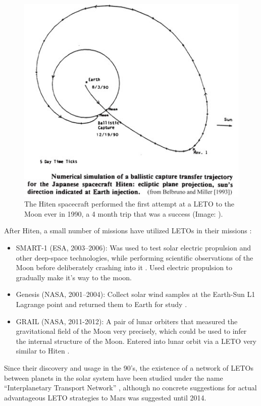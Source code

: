 \begin{figure}[ht]
    \centering
    \includegraphics[width=0.60\linewidth]{fig/hiten.png}
    \caption{The Hiten spacecraft performed the first attempt at a LETO to the Moon ever in 1990, a 4 month trip that was a success (Image: \cite{Belbuno1990}).}
    \label{fig:hiten}
\end{figure}

After Hiten, a small number of missions have utilized LETOs in their missions \cite{Wikipedia}:
\begin{itemize}
	\item SMART-1 (ESA, 2003--2006): Was used to test solar electric propulsion and other deep-space technologies, while performing scientific observations of the Moon before deliberately crashing into it \cite{ESA}. Used electric propulsion to gradually make it's way to the moon.
    \item Genesis (NASA, 2001--2004): Collect solar wind samples at the Earth-Sun L1 Lagrange point and returned them to Earth for study \cite{NASAa}.
    \item GRAIL (NASA, 2011-2012): A pair of lunar orbiters that measured the gravitational field of the Moon very precisely, which could be used to infer the internal structure of the Moon. Entered into lunar orbit via a LETO very similar to Hiten \cite{NASA2013,Wikipediaa}. 
\end{itemize}

Since their discovery and usage in the 90's, the existence of a network of LETOs between planets in the solar system have been studied under the name ``Interplanetary Transport Network'' \cite{Ross2006}, although no concrete suggestions for actual advantageous LETO strategies to Mars was suggested until 2014.

